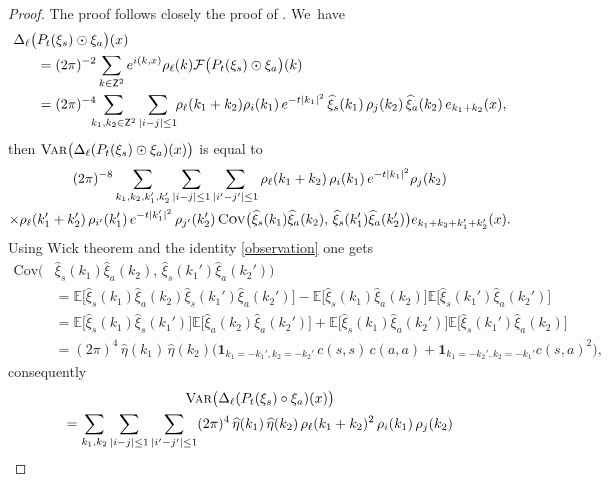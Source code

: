 \documentclass[JEP,XML,SOM,Unicode,published]{cedram}
\theoremstyle{definition}
\newcommand\bbE{\mathbb{E}}
\newcommand{\bsfZ}{\mathbf{\mathsf{Z}}}
\newcommand{\bfone}{\mathbf{1}}
\begin{document}
\begin{proof}
The proof follows closely the proof of \cite[Lem.\,5.2]{GIP}. We~have
\begin{align*}
\Delta_\ell\bigl(&P_t(\xi_s)\odot \xi_a\bigr)(x) \\
&= (2\pi)^{-2}\sum_{k\in\bsfZ^2}e^{i(k,x)}\rho_\ell(k) \mathcal{F}\bigl(P_t(\xi_s)\odot\xi_a\bigr)(k) \\
&=(2\pi)^{-4} \hspace{-0.2cm} \sum_{k_1,k_2\in\bsfZ^2}\sum_{|i-j|\leq 1} \hspace{-0.1cm} \rho_\ell(k_1+k_2)\rho_i(k_1) \, e^{-t|k_1|^2} \, \widehat\xi_s(k_1) \, \rho_j(k_2) \, \widehat\xi_a(k_2) \, e_{k_1+k_2}(x),
\end{align*}
then $\textsc{{Var}}\bigl(\Delta_\ell(P_t(\xi_s)\odot\xi_a)(x)\bigr)$ is equal to
\begin{multline*}
(2\pi)^{-8}\sum_{k_1,k_2,k_1',k_2'}\sum_{|i-j|\leq 1}\sum_{|i'-j'|\leq 1}\rho_\ell(k_1+k_2) \, \rho_i(k_1) \, e^{-t|k_1|^2}\rho_j(k_2)
\\
\times\rho_\ell(k_1'+k_2') \, \rho_{i'}(k_1') \, e^{-t|k_1'|^2} \, \rho_{j'}(k_2') \, \textsc{Cov}\bigl(\widehat\xi_s(k_1)\widehat\xi_a(k_2),\, \widehat\xi_s(k_1')\widehat\xi_a(k_2')\bigr)e_{k_1+k_2+k_1'+k_2'}(x).
\end{multline*}
Using Wick theorem and the identity \ref{observation} one gets
\begin{align*}
\text{Cov}\bigl(&\widehat\xi_s(k_1) \widehat\xi_a(k_2),\, \widehat\xi_s(k_1')\widehat\xi_a(k_2')\bigr) \\
&= \bbE\bigl[\widehat\xi_s(k_1)\widehat\xi_a(k_2)\widehat\xi_s(k_1')\widehat\xi_a(k_2')\bigr]-\bbE\bigl[\widehat\xi_s(k_1)\widehat\xi_a(k_2)\bigr]\bbE\bigl[\widehat\xi_s(k_1')\widehat\xi_a(k_2')\bigr] \\ &= \bbE\bigl[\widehat\xi_s(k_1)\widehat\xi_s(k_1')\bigr]\bbE\bigl[\widehat\xi_a(k_2)\widehat\xi_a(k_2')\bigr] + \bbE\bigl[\widehat\xi_s(k_1)\widehat\xi_a(k_2')\bigr]\bbE\bigl[\widehat\xi_s(k_1')\widehat\xi_a(k_2)\bigr] \\
&= (2\pi)^4 \, \widehat\eta(k_1) \, \widehat\eta(k_2)\bigl( \bfone_{k_1=-k_1', k_2=-k_2'}\,c(s,s) \, c(a,a) + \bfone_{k_1=-k_2', k_2=-k_1'}c(s,a)^2\bigr),
\end{align*}
consequently
\begin{multline*}
\textsc{{Var}}\bigl(\Delta_\ell(P_t(\xi_s)\circ\xi_a)(x)\bigr) \\
= \sum_{k_1,k_2} \sum_{|i-j|\leq 1}\sum_{|i'-j'|\leq 1} (2\pi)^4 \, \widehat\eta(k_1) \, \widehat\eta(k_2) \, \rho_\ell(k_1+k_2)^2 \, \rho_i(k_1) \, \rho_j(k_2)

\end{multline*}
\end{proof}
\end{document}
